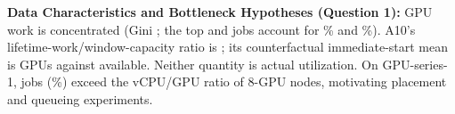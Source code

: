 \textbf{Data Characteristics and Bottleneck Hypotheses (Question 1):} GPU work is concentrated (Gini \QOneGini{}; the top \QOneTopOneCount{} and \QOneTopFiveCount{} jobs account for \QOneTopOneShare\% and \QOneTopFiveShare\%). A10's lifetime-work/window-capacity ratio is \QOneAtenRho{}; its counterfactual immediate-start mean is \QOneAtenMean{} GPUs against \QOneAtenCapacity{} available. Neither quantity is actual utilization. On GPU-series-1, \QOneHighRatioJobs{} jobs (\QOneHighRatioPct\%) exceed the \QOneRatioThreshold{} vCPU/GPU ratio of 8-GPU nodes, motivating placement and queueing experiments.
